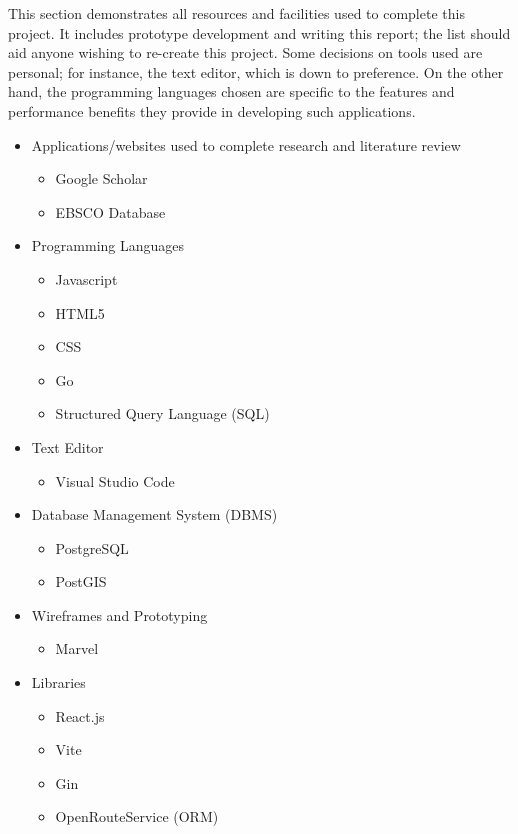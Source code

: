 This section demonstrates all resources and facilities used to complete this project. It includes prototype development and writing this report; the list should aid anyone wishing to re-create this project. Some decisions on tools used are personal; for instance, the text editor, which is down to preference. On the other hand, the programming languages chosen are specific to the features and performance benefits they provide in developing such applications.

\begin{itemize}
    \item Applications/websites used to complete research and literature review
    \begin{itemize}
        \item Google Scholar
        \item EBSCO Database
    \end{itemize}
    \item Programming Languages
    \begin{itemize}
        \item Javascript
        \item HTML5
        \item CSS
        \item Go
        \item Structured Query Language (SQL)
    \end{itemize}
    \item Text Editor
    \begin{itemize}
        \item Visual Studio Code
    \end{itemize}
    \item Database Management System (DBMS)
    \begin{itemize}
        \item PostgreSQL
        \item PostGIS
    \end{itemize}
    \item Wireframes and Prototyping
    \begin{itemize}
        \item Marvel
    \end{itemize}
    \item Libraries
    \begin{itemize}
        \item React.js
        \item Vite
        \item Gin
        \item OpenRouteService (ORM)

\end{itemize}
\end{itemize}
